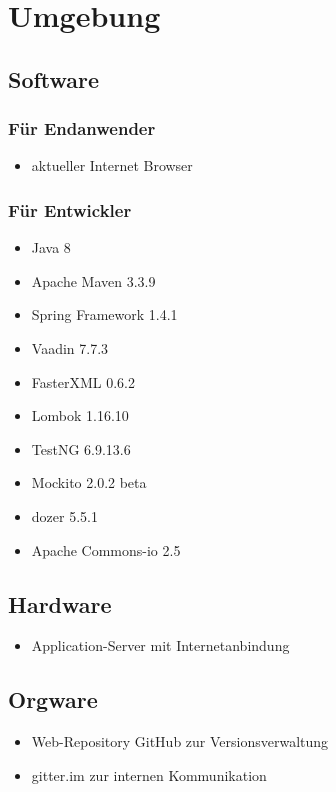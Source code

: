  
\section{Umgebung}
 
\subsection{Software}
\subsubsection {Für Endanwender}

\begin{itemize}
\item aktueller Internet Browser
\end{itemize}

\subsubsection	{Für Entwickler}

\begin{itemize}
\item Java 8
\item Apache Maven 3.3.9
\item Spring Framework 1.4.1
\item Vaadin 7.7.3
\item FasterXML 0.6.2
\item Lombok 1.16.10
\item TestNG 6.9.13.6
\item Mockito 2.0.2 beta
\item dozer 5.5.1
\item Apache Commons-io 2.5
\end{itemize}
 
\subsection{Hardware}

\begin{itemize}
\item Application-Server mit Internetanbindung
\end{itemize} 

\subsection{Orgware}
\begin{itemize}
\item Web-Repository GitHub zur Versionsverwaltung
\item gitter.im zur internen Kommunikation 
\end{itemize}
